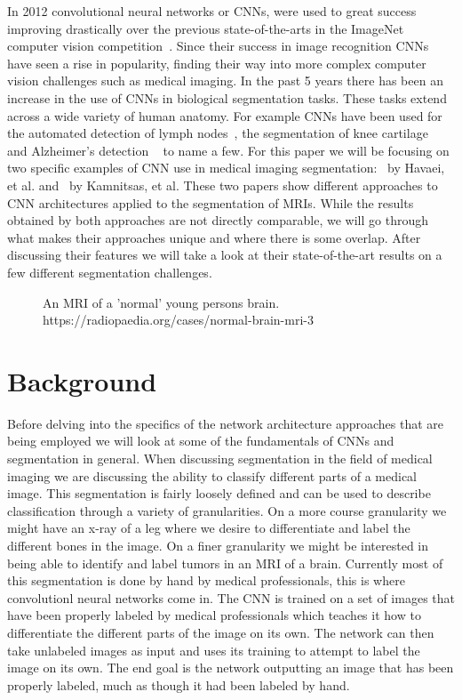 \documentclass{sig-alternate}
\begin{document}
In 2012 convolutional neural networks or CNNs, were used to great success improving drastically over the previous state-of-the-arts in the ImageNet computer vision competition~\cite{NIPS:2012}. Since their success in image recognition CNNs have seen a rise in popularity, finding their way into more complex computer vision challenges such as medical imaging. In the past 5 years there has been an increase in the use of CNNs in biological segmentation tasks. These tasks extend across a wide variety of human anatomy. For example CNNs have been used for the automated detection of lymph nodes~\cite{Roth:2014}, the segmentation of knee cartilage~\cite{Prasoon:2013} and Alzheimer's detection ~\cite{Payan:2015} to name a few. For this paper we will be focusing on two specific examples of CNN use in medical imaging segmentation:~\cite{Havaei:2017} by Havaei, et al. and~\cite{Kamnitsas:2017} by Kamnitsas, et al. These two papers show different approaches to CNN architectures applied to the segmentation of MRIs. While the results obtained by both approaches are not directly comparable, we will go through what makes their approaches unique and where there is some overlap. After discussing their features we will take a look at their state-of-the-art results on a few different segmentation challenges.

\begin{figure}
\centering
{}
\caption{An MRI of a 'normal' young persons brain. https://radiopaedia.org/cases/normal-brain-mri-3}
\label{fig:brainMRI}
\end{figure}

\section{Background}
\label{sec:background}

Before delving into the specifics of the network architecture approaches that are being employed we will look at some of the fundamentals of CNNs and segmentation in general. When discussing segmentation in the field of medical imaging we are discussing the ability to classify different parts of a medical image. This segmentation is fairly loosely defined and can be used to describe classification through a variety of granularities. On a more course granularity we might have an x-ray of a leg where we desire to differentiate and label the different bones in the image. On a finer granularity we might be interested in being able to identify and label tumors in an MRI of a brain. Currently most of this segmentation is done by hand by medical professionals, this is where convolutionl neural networks come in. The CNN is trained on a set of images that have been properly labeled by medical professionals which teaches it how to differentiate the different parts of the image on its own. The network can then take unlabeled images as input and uses its training to attempt to label the image on its own. The end goal is the network outputting an image that has been properly labeled, much as though it had been labeled by hand. 
\end{document}
